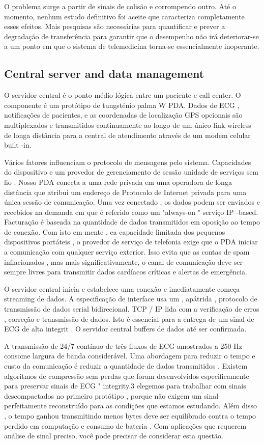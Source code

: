 \documentclass[a4paper,12pt]{article}
\begin{document}
O problema surge a partir de sinais de colisão e corrompendo outro. Até o momento, nenhum estudo definitivo foi aceite que caracteriza completamente esses efeitos. Mais pesquisas são necessárias para quantificar e prever a degradação de transferência para garantir que o desempenho não irá deteriorar-se a um ponto em que o sistema de telemedicina torna-se essencialmente inoperante.

\subsection{Central server and data management}

O servidor central é o ponto médio lógica entre um paciente e call center. O componente é um protótipo de tungsténio palma W PDA. Dados de ECG , notificações de pacientes, e as coordenadas de localização GPS opcionais são multiplexados e transmitidos continuamente ao longo de um único link wireless de longa distância para a central de atendimento através de um modem celular built -in.

Vários fatores influenciam o protocolo de mensagens pelo sistema. Capacidades do dispositivo e um provedor de gerenciamento de sessão unidade de serviços sem fio . Nosso PDA conecta a uma rede privada em uma operadora de longa distância que atribui um endereço de Protocolo de Internet privada para uma única sessão de comunicação. Uma vez conectado , os dados podem ser enviados e recebidos na demanda em que é referido como um "always-on " serviço IP -based. Facturação é baseada na quantidade de dados transmitidos em oposição ao tempo de conexão. Com isto em mente , ea capacidade limitada dos pequenos dispositivos portáteis , o provedor de serviço de telefonia exige que o PDA iniciar a comunicação com qualquer serviço exterior. Isso evita que as contas de spam inflacionados , mas mais significativamente, o canal de comunicação deve ser sempre livres para transmitir dados cardíacos críticas e alertas de emergência.

O servidor central inicia e estabelece uma conexão e imediatamente começa streaming de dados. A especificação de interface usa um , apátrida , protocolo de transmissão de dados serial bidirecional. TCP / IP lida com a verificação de erros , correção e transmissão de dados. Isto é essencial para a entrega de um sinal de ECG de alta integrit . O servidor central buffers de dados até ser confirmada.

A transmissão de 24/7 contínuo de três fluxos de ECG amostrados a 250 Hz consome largura de banda considerável. Uma abordagem para reduzir o tempo e custo da comunicação é reduzir a quantidade de dados transmitidos . Existem algoritmos de compressão sem perdas que foram desenvolvidos especificamente para preservar sinais de ECG " integrity.3 elegemos para trabalhar com sinais descompactados no primeiro protótipo , porque não exigem um sinal perfeitamente reconstruído para as condições que estamos estudando. Além disso , o tempo ganhou transmitindo menos bytes deve ser equilibrado contra o tempo perdido em computação e consumo de bateria . Com aplicações que requerem análise de sinal preciso, você pode precisar de considerar esta questão.
\end{document}
